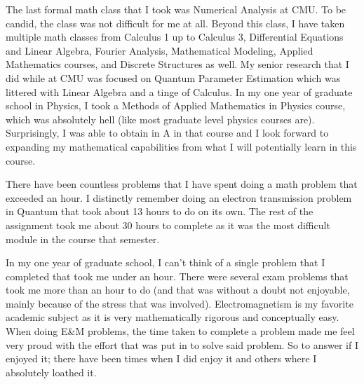  {
    \begin{highlight}
        The last formal math class that I took was Numerical Analysis at CMU. To be candid, the class was not difficult for me at all. Beyond this class, I have taken multiple math classes from
        Calculus 1 up to Calculus 3, Differential Equations and Linear Algebra, Fourier Analysis, Mathematical Modeling, Applied Mathematics courses, and Discrete Structures as well. My senior 
        research that I did while at CMU was focused on Quantum Parameter Estimation which was littered with Linear Algebra and a tinge of Calculus. In my one year of graduate school in Physics, 
        I took a Methods of Applied Mathematics in Physics course, which was absolutely hell (like most graduate level physics courses are). Surprisingly, I was able to obtain in A in that course 
        and I look forward to expanding my mathematical capabilities from what I will potentially learn in this course.
    \end{highlight}
}

 {
    \begin{highlight}
        There have been countless problems that I have spent doing a math problem that exceeded an hour. I distinctly remember doing an electron transmission problem in Quantum that took about 13 
        hours to do on its own. The rest of the assignment took me about 30 hours to complete as it was the most difficult module in the course that semester.

        In my one year of graduate school, I can't think of a single problem that I completed that took me under an hour. There were several exam problems that took me more than an hour to do (and 
        that was without a doubt not enjoyable, mainly because of the stress that was involved). Electromagnetism is my favorite academic subject as it is very mathematically rigorous and conceptually
        easy. When doing E\&M problems, the time taken to complete a problem made me feel very proud with the effort that was put in to solve said problem. So to answer if I enjoyed it; there have been
        times when I did enjoy it and others where I absolutely loathed it.
    \end{highlight}
}

